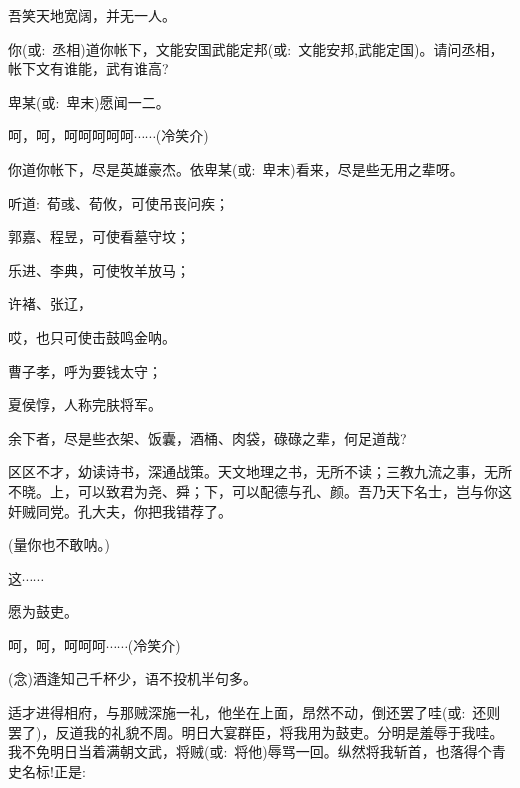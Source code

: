 {吾笑天地宽阔，并无一人。

你({\akai 或}:~丞相)道你帐下，文能安国武能定邦({\akai 或}:~文能安邦,武能定国)。请问丞相，帐下文有谁能，武有谁高?

卑某({\akai 或}:~卑末)愿闻一二。

呵，呵，呵呵呵呵呵$\cdots{}\cdots{}$({\hwfs 冷笑介})

你道你帐下，尽是英雄豪杰。依卑某({\akai 或}:~卑末)看来，尽是些无用之辈呀。

听道:~荀彧、荀攸，可使吊丧问疾；

郭嘉、程昱，可使看墓守坟；

乐进、李典，可使牧羊放马；

许褚、张辽，

哎，也只可使击鼓鸣金呐。

曹子孝，呼为要钱太守；

夏侯惇，人称完肤将军。

余下者，尽是些衣架、饭囊，酒桶、肉袋，碌碌之辈，何足道哉?

区区不才，幼读诗书，深通战策。天文地理之书，无所不读；三教九流之事，无所不晓。上，可以致君为尧、舜；下，可以配德与孔、颜。吾乃天下名士，岂与你这奸贼同党。孔大夫，你把我错荐了。


(量你也不敢呐。)

这$\cdots{}\cdots{}$

愿为鼓吏。

呵，呵，呵呵呵$\cdots{}\cdots{}$({\hwfs 冷笑介})


\vspace{5pt}



({\akai 念})酒逢知己千杯少，语不投机半句多。

适才进得相府，与那贼深施一礼，他坐在上面，昂然不动，倒还罢了哇({\akai 或}:~还则罢了)，反道我的礼貌不周。明日大宴群臣，将我用为鼓吏。分明是羞辱于我哇。我不免明日当着满朝文武，将贼({\akai 或}:~将他)辱骂一回。纵然将我斩首，也落得个青史名标!正是:~

}
